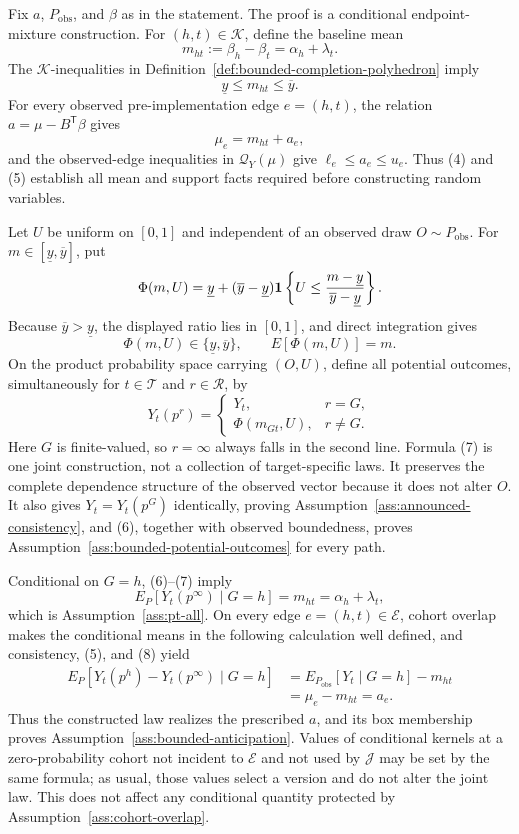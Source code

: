 Fix \(a\), \(P_{\mathrm{obs}}\), and \(\beta\) as in the statement.  The proof is a conditional endpoint-mixture construction.  For \((h,t)\in\mathcal K\), define the baseline mean
\[
 m_{ht}:=\beta_h-\beta_t=\alpha_h+\lambda_t.
\]
The \(\mathcal K\)-inequalities in Definition~\ref{def:bounded-completion-polyhedron} imply
\[
 \underline y\le m_{ht}\le\overline y. \tag{4}
\]
For every observed pre-implementation edge \(e=(h,t)\), the relation \(a=\mu-B^{\mathsf T}\beta\) gives
\[
 \mu_e=m_{ht}+a_e, \tag{5}
\]
and the observed-edge inequalities in \(\mathcal Q_Y(\mu)\) give \(\ell_e\le a_e\le u_e\).  Thus (4) and (5) establish all mean and support facts required before constructing random variables.

Let \(U\) be uniform on \([0,1]\) and independent of an observed draw \(O\sim P_{\mathrm{obs}}\).  For \(m\in[\underline y,\overline y]\), put
\[
 \Phi(m,U)=\underline y+(\overline y-\underline y)
 \mathbf 1\left\{U\le {m-\underline y\over \overline y-\underline y}\right\}.
\]
Because \(\overline y>\underline y\), the displayed ratio lies in \([0,1]\), and direct integration gives
\[
 \Phi(m,U)\in\{\underline y,\overline y\},
 \qquad E[\Phi(m,U)]=m. \tag{6}
\]
On the product probability space carrying \((O,U)\), define all potential outcomes, simultaneously for \(t\in\mathcal T\) and \(r\in\mathcal R\), by
\[
 Y_t(p^r)=
 \begin{cases}
 Y_t,& r=G,\\
 \Phi(m_{Gt},U),& r\ne G.
 \end{cases} \tag{7}
\]
Here \(G\) is finite-valued, so \(r=\infty\) always falls in the second line.  Formula (7) is one joint construction, not a collection of target-specific laws.  It preserves the complete dependence structure of the observed vector because it does not alter \(O\).  It also gives \(Y_t=Y_t(p^G)\) identically, proving Assumption~\ref{ass:announced-consistency}, and (6), together with observed boundedness, proves Assumption~\ref{ass:bounded-potential-outcomes} for every path.

Conditional on \(G=h\), (6)--(7) imply
\[
 E_P[Y_t(p^\infty)\mid G=h]=m_{ht}=\alpha_h+\lambda_t, \tag{8}
\]
which is Assumption~\ref{ass:pt-all}.  On every edge \(e=(h,t)\in\mathcal E\), cohort overlap makes the conditional means in the following calculation well defined, and consistency, (5), and (8) yield
\[
 \begin{aligned}
 E_P[Y_t(p^h)-Y_t(p^\infty)\mid G=h]
 &=E_{P_{\mathrm{obs}}}[Y_t\mid G=h]-m_{ht}\\
 &=\mu_e-m_{ht}=a_e.
 \end{aligned} \tag{9}
\]
Thus the constructed law realizes the prescribed \(a\), and its box membership proves Assumption~\ref{ass:bounded-anticipation}.  Values of conditional kernels at a zero-probability cohort not incident to \(\mathcal E\) and not used by \(\mathcal J\) may be set by the same formula; as usual, those values select a version and do not alter the joint law.  This does not affect any conditional quantity protected by Assumption~\ref{ass:cohort-overlap}.

